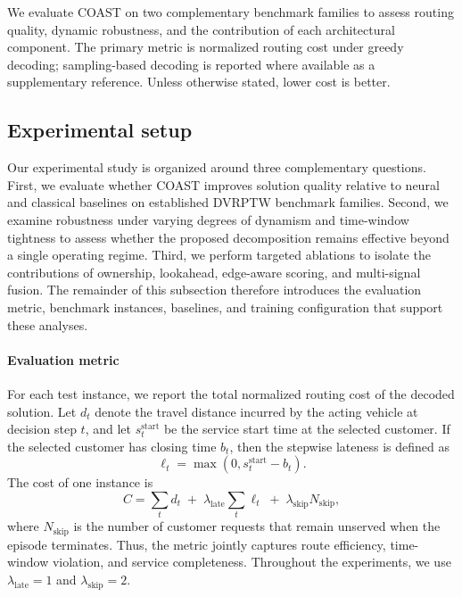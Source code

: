 \documentclass[letterpaper]{article}
\begin{document}
\iffalse

We evaluate COAST on two complementary benchmark families to assess routing quality, dynamic robustness, and the contribution of each architectural component. The primary metric is normalized routing cost under greedy decoding; sampling-based decoding is reported where available as a supplementary reference. Unless otherwise stated, lower cost is better.

\subsection{Experimental setup}

Our experimental study is organized around three complementary questions. First, we evaluate whether COAST improves solution quality relative to neural and classical baselines on established DVRPTW benchmark families. Second, we examine robustness under varying degrees of dynamism and time-window tightness to assess whether the proposed decomposition remains effective beyond a single operating regime. Third, we perform targeted ablations to isolate the contributions of ownership, lookahead, edge-aware scoring, and multi-signal fusion. The remainder of this subsection therefore introduces the evaluation metric, benchmark instances, baselines, and training configuration that support these analyses.

\paragraph{Evaluation metric}
For each test instance, we report the total normalized routing cost of the decoded solution. Let $d_t$ denote the travel distance incurred by the acting vehicle at decision step $t$, and let $s_t^{\mathrm{start}}$ be the service start time at the selected customer. If the selected customer has closing time $b_t$, then the stepwise lateness is defined as
\[
\ell_t = \max(0, s_t^{\mathrm{start}} - b_t).
\]
The cost of one instance is
\[
C
=
\sum_t d_t
\;+\;
\lambda_{\mathrm{late}} \sum_t \ell_t
\;+\;
\lambda_{\mathrm{skip}} N_{\mathrm{skip}},
\]
where $N_{\mathrm{skip}}$ is the number of customer requests that remain unserved when the episode terminates. Thus, the metric jointly captures route efficiency, time-window violation, and service completeness. Throughout the experiments, we use $\lambda_{\mathrm{late}} = 1$ and $\lambda_{\mathrm{skip}} = 2$.
\end{document}
